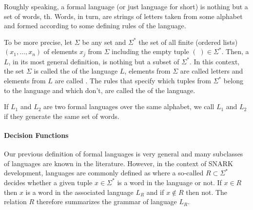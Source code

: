 Roughly speaking, a formal language (or just language for short) is nothing but a set of words, th. Words, in turn, are strings of letters taken from some alphabet and formed according to some defining rules of the language. 

To be more precise, let $\Sigma$ be any set and $\Sigma^*$ the set of all finite  (ordered lists) $(x_1,\ldots,x_n)$ of elements $x_j$ from $\Sigma$ including the empty tuple $(\;)\in \Sigma^*$. Then, a  $L$, in its most general definition, is nothing but a subset of $\Sigma^*$. In this context, the set $\Sigma$ is called the  of the language $L$, elements from $\Sigma$ are called letters and elements from $L$ are called . The rules that specify which tuples from $\Sigma^*$ belong to the language and which don't, are called the  of the language. 

If $L_1$ and $L_2$ are two formal languages over the same alphabet, we call $L_1$ and $L_2$  if they generate the same set of words. 

\paragraph{Decision Functions} Our previous definition of formal languages is very general and many subclasses of languages are known in the literature. However,  in the context of SNARK development, languages are commonly defined as  where a so-called  $R\subset \Sigma^*$ decides whether a given tuple $x\in \Sigma^*$ is a word in the language or not. If $x\in R$ then $x$ is a word in the associated language $L_R$ and if $x\notin R$ then not. The relation $R$ therefore summarizes the grammar of language $L_R$.

